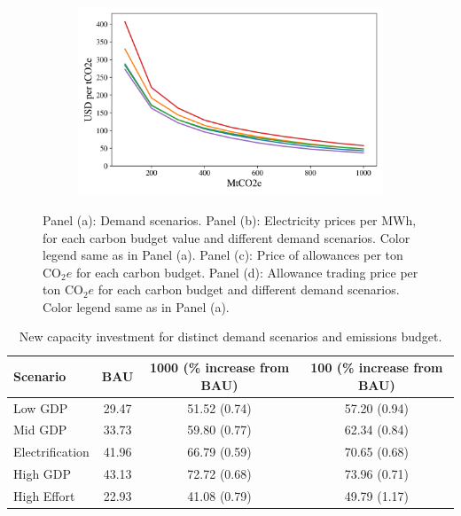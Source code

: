 \documentclass[11pt, letterpaper]{article}
\begin{document}
\begin{figure}[ht]
\begin{subfigure}[t]{0.5\linewidth}
    \caption{  }
  \label{fig:price_allo}
  \end{subfigure}
    \begin{subfigure}[t]{0.5\linewidth}
    \includegraphics[width=\textwidth]{draft_paper/Figures/prices_trading_scenarios.png}
    \caption{}
  \label{fig:price_trade}
  \end{subfigure}\quad
   \caption{Panel (a): Demand scenarios. Panel (b): Electricity prices per MWh, for each carbon budget value and different demand scenarios. Color legend same as in Panel (a). Panel (c): Price of allowances per ton CO$_2e$ for each carbon budget. Panel (d): Allowance trading price per ton CO$_2e$ for each carbon budget and different demand scenarios. Color legend same as in Panel (a).}
\end{figure}

\small
\begin{table}[h]
    \centering
    \begin{tabular}{ l| c c c   } 
\hline
Scenario	    &	BAU    	&	1000 (\% increase from BAU)	    &	100 (\% increase from BAU)	        \\
\hline
Low GDP	        &	29.47	&	51.52 (0.74)	&	57.20 (0.94)	\\
Mid GDP 	    &	33.73	&	59.80 (0.77)	&	62.34 (0.84) 	\\
Electrification	&	41.96	&	66.79 (0.59)	&	70.65 (0.68)	\\
High GDP	    &	43.13	&	72.72 (0.68)	&	73.96 (0.71)	\\
High Effort	    &	22.93   &	41.08 (0.79)	&	49.79 (1.17)	\\
\hline
\end{tabular}
    \caption{New capacity investment for distinct demand scenarios and emissions budget.}
    \label{tab:InvestmentStoch}
\end{table}
\normalsize
\end{document}
